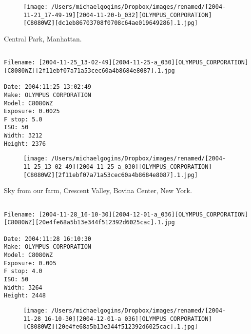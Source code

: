 \documentclass[11pt,letter,DIV=14,paper=landscape]{scrbook}
\begin{document}
\begin{figure}
\texttt{[image: /Users/michaelgogins/Dropbox/images/renamed/[2004-11-21\_17-49-19][2004-11-20-b\_032][OLYMPUS\_CORPORATION][C8080WZ][dc1eb86703708f0708c64ae019649286].1.jpg]}
\end{figure}
    
\clearpage
\noindent Central Park, Manhattan.
\noindent
\begin{lstlisting}

Filename: [2004-11-25_13-02-49][2004-11-25-a_030][OLYMPUS_CORPORATION][C8080WZ][2f11ebf07a71a53cec60a4b8684e8087].1.jpg

Date: 2004:11:25 13:02:49
Make: OLYMPUS CORPORATION
Model: C8080WZ
Exposure: 0.0025
F stop: 5.0
ISO: 50
Width: 3212
Height: 2376
\end{lstlisting}
\clearpage

\begin{figure}
\texttt{[image: /Users/michaelgogins/Dropbox/images/renamed/[2004-11-25\_13-02-49][2004-11-25-a\_030][OLYMPUS\_CORPORATION][C8080WZ][2f11ebf07a71a53cec60a4b8684e8087].1.jpg]}
\end{figure}
    
\clearpage
\noindent Sky from our farm, Crescent Valley, Bovina Center, New York.
\noindent
\begin{lstlisting}

Filename: [2004-11-28_16-10-30][2004-12-01-a_036][OLYMPUS_CORPORATION][C8080WZ][20e4fe68a5b13e344f512392d6025cac].1.jpg

Date: 2004:11:28 16:10:30
Make: OLYMPUS CORPORATION
Model: C8080WZ
Exposure: 0.005
F stop: 4.0
ISO: 50
Width: 3264
Height: 2448
\end{lstlisting}
\clearpage

\begin{figure}
\texttt{[image: /Users/michaelgogins/Dropbox/images/renamed/[2004-11-28\_16-10-30][2004-12-01-a\_036][OLYMPUS\_CORPORATION][C8080WZ][20e4fe68a5b13e344f512392d6025cac].1.jpg]}
\end{figure}
    
\end{document}
